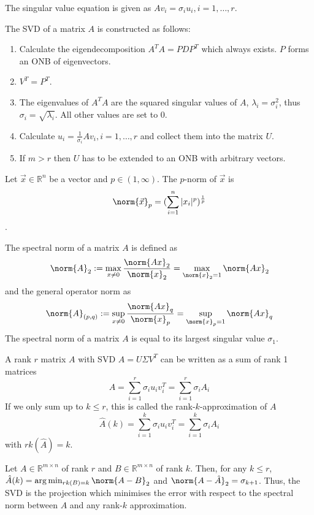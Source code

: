 The singular value equation is given as $A v_i = \sigma_i u_i, i = 1, \dotsc, r$.

The SVD of a matrix $A$ is constructed as follows:

\begin{enumerate}
    \item Calculate the eigendecomposition $A^T A = P D P^T$ which always exists.
    $P$ forms an ONB of eigenvectors.
    \item $V^T = P^T$.
    \item The eigenvalues of $A^T A$ are the squared singular values of $A$,
    $\lambda_i = \sigma_i^2$, thus $\sigma_i = \sqrt{\lambda_i}$.
    All other values are set to $0$.
    \item Calculate $u_i = \frac{1}{\sigma_i} A v_i, i = 1, \dotsc, r$
    and collect them into the matrix $U$.
    \item If $m > r$ then $U$ has to be extended to an ONB with arbitrary vectors.
\end{enumerate}

Let $\vec{x} \in \mathbb{R}^n$ be a vector and $p \in (1, \infty)$.
The $p$-norm of $\vec{x}$ is
\begin{equation*}
    \norm{\vec{x}}_p = (\sum_{i = 1}^n{|x_i|^p})^\frac{1}{p}
\end{equation*}.

The spectral norm of a matrix $A$ is defined as
\begin{equation*}
    \norm{A}_2 := \max_{x \neq 0}{\frac{\norm{Ax}_2}{\norm{x}_2}} = \max_{\norm{x}_2 = 1}{\norm{Ax}_2}
\end{equation*}
and the general operator norm as
\begin{equation*}
    \norm{A}_{(p,q)} :=
    \sup_{x \neq 0}{\frac{\norm{Ax}_q}{\norm{x}_p}} = \sup_{\norm{x}_p = 1}{\norm{Ax}_q}
\end{equation*}
The spectral norm of a matrix $A$ is equal to its largest singular value $\sigma_1$.

A rank $r$ matrix $A$ with SVD $A = U \Sigma V^T$ can be written as a sum of rank 1 matrices
\begin{equation*}
    A = \sum_{i=1}^r{\sigma_i u_i v_i^T} = \sum_{i=1}^r{\sigma_i A_i}
\end{equation*}
If we only sum up to $k \leq r$, this is called the rank-$k$-approximation of $A$
\begin{equation*}
    \hat{A}(k) = \sum_{i=1}^k{\sigma_i u_i v_i^T} = \sum_{i=1}^k{\sigma_i A_i}
\end{equation*}
with $rk(\hat{A}) = k$.

Let $A \in \mathbb{R}^{m \times n}$ of rank $r$ and
$B \in \mathbb{R}^{m \times n}$ of rank $k$.
Then, for any $k \leq r$,
$\hat{A}(k) = \arg\min_{rk(B) = k}\norm{A - B}_2$ and
$\norm{A - \hat{A}}_2 = \sigma_{k + 1}$.
Thus, the SVD is the projection which minimises the error with respect to the spectral norm
between $A$ and any rank-$k$ approximation.
